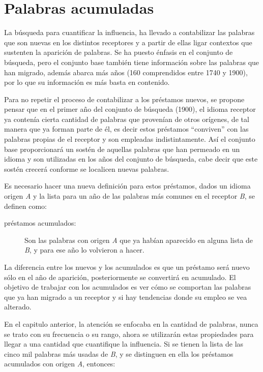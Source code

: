\chapter{Palabras acumuladas}

La búsqueda para cuantificar la influencia, ha llevado a contabilizar las palabras que son nuevas en los distintos receptores y a partir de ellas ligar contextos que sustenten la aparición de palabras.  Se ha puesto énfasis en el conjunto de búsqueda, pero  el conjunto base  también tiene información sobre las palabras que han migrado, además  abarca más años (160 comprendidos entre 1740 y 1900), por lo que su información es más basta en contenido. 

Para no repetir el proceso de contabilizar a los préstamos nuevos,  se propone pensar que en el primer año del conjunto de búsqueda (1900),  el idioma receptor ya contenía cierta cantidad de palabras que provenían de otros orígenes,  de tal manera que ya forman parte de él, es decir estos préstamos ``conviven'' con las palabras propias de el receptor y son empleadas indistintamente. Así el conjunto base proporcionará un sostén de aquellas palabras que han permeado en un idioma y son utilizadas en los años del conjunto de búsqueda,  cabe decir que este sostén crecerá conforme se localicen nuevas palabras. 

Es necesario hacer una nueva definición para estos préstamos, dados un idioma  origen  \textit{A} y la lista para un año  de las palabras más comunes en el receptor \textit{B},  se definen como: 

\begin{description}
	\item[préstamos acumulados:] Son las palabras con origen \textit{A} que ya habían aparecido en alguna lista de \textit{B}, y para ese año lo volvieron a hacer.  
\end{description}

La diferencia entre los nuevos y los acumulados es que un préstamo será nuevo sólo en el año de aparición, posteriormente se convertirá en acumulado. El objetivo  de trabajar con los acumulados es ver cómo se comportan las palabras que ya han migrado a un receptor y si hay tendencias donde su empleo se vea alterado.  

En el capitulo anterior, la atención se enfocaba en la cantidad de palabras, nunca se trato con su frecuencia o su rango, ahora se utilizarán estas propiedades  para llegar a una cantidad que cuantifique la influencia. Si se tienen la lista de las cinco mil palabras más usadas  de \textit{B}, y se distinguen en ella los préstamos acumulados con origen \textit{A}, entonces: 

